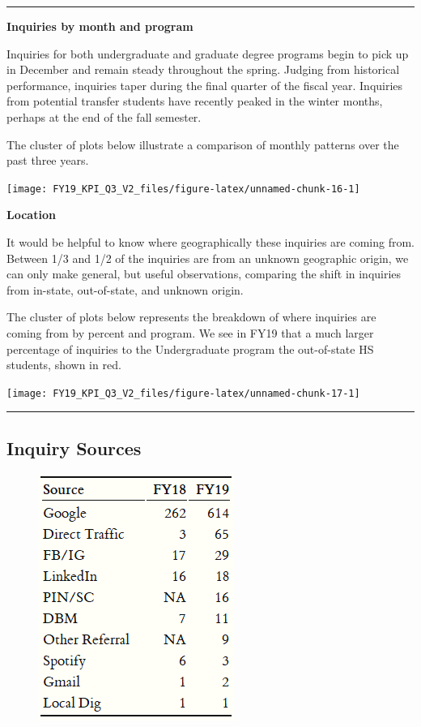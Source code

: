 \documentclass[]{tufte-handout}
\begin{document}
\begin{center}\rule{0.5\linewidth}{\linethickness}\end{center}

\textbf{Inquiries by month and program}

Inquiries for both undergraduate and graduate degree programs begin to
pick up in December and remain steady throughout the spring. Judging
from historical performance, inquiries taper during the final quarter of
the fiscal year. Inquiries from potential transfer students have
recently peaked in the winter months, perhaps at the end of the fall
semester.

The cluster of plots below illustrate a comparison of monthly patterns
over the past three years.

\texttt{[image: FY19\_KPI\_Q3\_V2\_files/figure-latex/unnamed-chunk-16-1]}

\textbf{Location}

It would be helpful to know where geographically these inquiries are
coming from. Between 1/3 and 1/2 of the inquiries are from an unknown
geographic origin, we can only make general, but useful observations,
comparing the shift in inquiries from in-state, out-of-state, and
unknown origin.

The cluster of plots below represents the breakdown of where inquiries
are coming from by percent and program. We see in FY19 that a much
larger percentage of inquiries to the Undergraduate program the
out-of-state HS students, shown in red.

\texttt{[image: FY19\_KPI\_Q3\_V2\_files/figure-latex/unnamed-chunk-17-1]}

\begin{center}\rule{0.5\linewidth}{\linethickness}\end{center}

\subsection{Inquiry Sources}\label{inquiry-sources}

\begin{figure}
\centering
\includegraphics{Capture.PNG}
\caption{}
\end{figure}
\end{document}

